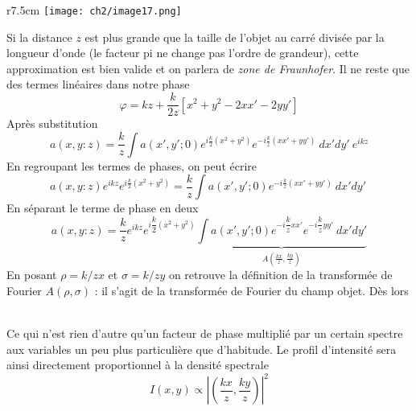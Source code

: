 \begin{wrapfigure}[9]{r}{7.5cm}
\vspace{-5mm}
\texttt{[image: ch2/image17.png]}
\end{wrapfigure}
Si la distance $z$ est plus grande que la taille de l'objet au carré divisée par la longueur 
d'onde (le facteur pi ne change pas l'ordre de grandeur), cette approximation est bien valide
et on  parlera de \textit{zone de Fraunhofer}. Il ne reste que des termes linéaires dans notre 
phase
\begin{equation}
\varphi = kz + \frac{k}{2z}\left[x^2 + y^2 - 2xx'-2yy'\right]
\end{equation}
Après substitution
\begin{equation}
a(x,y:z) = \frac{k}{z}\int a(x',y';0) e^{i\frac{k}{2}(x^2+y^2)}e^{-i\frac{k}{z}(xx'+yy')}\ 
dx'dy'\ e^{ikz}
\end{equation}
En regroupant les termes de phases, on peut écrire
\begin{equation}
a(x,y:z)e^{ikz} e^{i\frac{k}{2}(x^2+y^2)} = \frac{k}{z}\int a(x',y';0) e^{-i\frac{k}{z}(xx'+yy')}\ 
dx'dy'\ 
\end{equation}
En séparant le terme de phase en deux
\begin{equation}
a(x,y:z) = \dfrac{k}{z} e^{ikz} e^{i\dfrac{k}{2}(x^2+y^2)} \underbrace{\int a(x',y';0) e^{-i\dfrac{k
}{z}xx'}e^{-i\dfrac{k}{z}yy'}\ dx'dy'}_{A\left(\frac{kx}{z},\frac{ky}{z}\right)}
\end{equation}
En posant $\rho = k/zx$ et $\sigma = k/zy$ on retrouve la définition de la transformée de Fourier 
$A(\rho,\sigma)$ : il s'agit de la transformée de Fourier du champ objet. Dès lors\\

\ 

Ce qui n'est rien d'autre qu'un facteur de phase multiplié par un certain spectre aux variables 
un peu plus particulière que d'habitude. Le profil d'intensité sera ainsi directement 
proportionnel à la densité spectrale
\begin{equation}
I(x,y) \propto \left| \left(\frac{kx}{z},\frac{ky}{z}\right) \right|^2
\end{equation}

